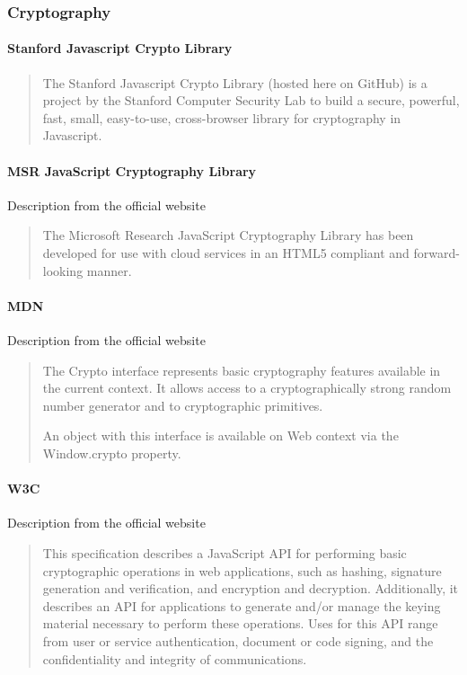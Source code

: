 
\subsubsection{Cryptography}
\paragraph{Stanford Javascript Crypto Library\cite{Stark2009SymmetricJavascript}}
\cite{University2009StanfordLibrary}
\blockquote{The Stanford Javascript Crypto Library (hosted here on GitHub) is a project by the Stanford Computer Security Lab to build a secure, powerful, fast, small, easy-to-use, cross-browser library for cryptography in Javascript.}

\paragraph{MSR JavaScript Cryptography Library}
Description from the official website \cite{Microsoft2015MSRLibrary}
\blockquote{The Microsoft Research JavaScript Cryptography Library has been developed for use with cloud services in an HTML5 compliant and forward-looking manner.}

\paragraph{MDN}
Description from the official website \cite{MDN2015MDNCrypto}
\blockquote{The Crypto interface represents basic cryptography features available in the current context. It allows access to a cryptographically strong random number generator and to cryptographic primitives.

An object with this interface is available on Web context via the Window.crypto property.}

\paragraph{W3C}
Description from the official website \cite{Sleevi2014WebAPI}
\blockquote{This specification describes a JavaScript API for performing basic cryptographic operations in web applications, such as hashing, signature generation and verification, and encryption and decryption. Additionally, it describes an API for applications to generate and/or manage the keying material necessary to perform these operations. Uses for this API range from user or service authentication, document or code signing, and the confidentiality and integrity of communications.}

